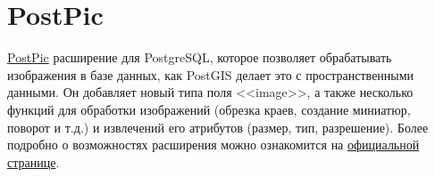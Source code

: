 \section{PostPic}

\href{http://drotiro.github.io/postpic/}{PostPic} расширение для PostgreSQL, которое позволяет обрабатывать изображения в базе данных, как PostGIS делает это с пространственными данными. Он добавляет новый типа поля <<image>>, а также несколько функций для обработки изображений (обрезка краев, создание миниатюр, поворот и т.д.) и извлечений его атрибутов (размер, тип, разрешение). Более подробно о возможностях расширения можно ознакомится на \href{https://github.com/drotiro/postpic/wiki/SQL-Functions-Guide}{официальной странице}.